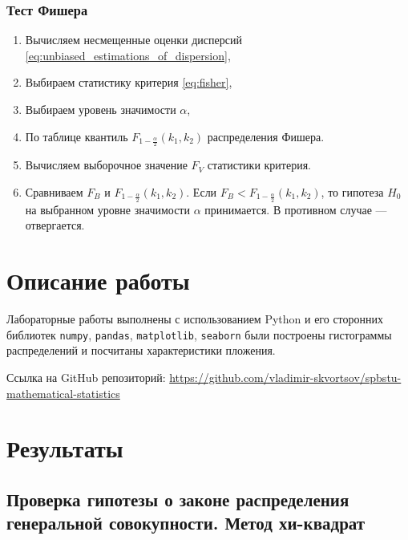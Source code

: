 \documentclass[12pt,a4paper]{article}
\begin{document}
		\subsubsection{Тест Фишера}

		\begin{enumerate}
			\item Вычисляем несмещенные оценки дисперсий
				\eqref{eq:unbiased_estimations_of_dispersion},
			\item Выбираем статистику критерия \eqref{eq:fisher},
			\item Выбираем уровень значимости \( \alpha \),
			\item По таблице квантиль \( F_{1 - \frac{\alpha}{2}} (k_1, k_2) \)
				распределения Фишера.
			\item Вычисляем выборочное значение \( F_V \) статистики критерия.
			\item Сравниваем \( F_B \) и \( F_{1 - \frac{\alpha}{2}} (k_1, k_2) \).
				Если \( F_B < F_{1 - \frac{\alpha}{2}} (k_1, k_2) \), то гипотеза
				\( H_0 \) на выбранном уровне значимости \( \alpha \) принимается.
				В противном случае — отвергается.
		\end{enumerate}

		\section{Описание работы}

		Лабораторные работы выполнены с использованием Python и его сторонних
		библиотек \verb!numpy!, \verb!pandas!, \verb!matplotlib!, \verb!seaborn! были
		построены гистограммы распределений и посчитаны характеристики пложения.

		Ссылка на GitHub репозиторий:
		\href{https://github.com/vladimir-skvortsov/spbstu-mathematical-statistics}
		{https://github.com/vladimir-skvortsov/spbstu-mathematical-statistics}

		\section{Результаты}

		\subsection{Проверка гипотезы о законе распределения генеральной
			совокупности. Метод хи-квадрат}
\end{document}
